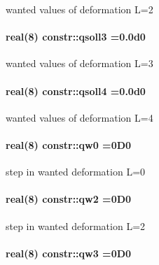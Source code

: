 wanted values of deformation L=2 

\paragraph[{\texorpdfstring{qsoll3}{qsoll3}}]{\setlength{\rightskip}{0pt plus 5cm}real(8) constr\+::qsoll3 =0.\+0d0}\hypertarget{namespaceconstr_a9efb1bbf605739cd45eb23ba02e096e4}{}\label{namespaceconstr_a9efb1bbf605739cd45eb23ba02e096e4}


wanted values of deformation L=3 

\paragraph[{\texorpdfstring{qsoll4}{qsoll4}}]{\setlength{\rightskip}{0pt plus 5cm}real(8) constr\+::qsoll4 =0.\+0d0}\hypertarget{namespaceconstr_a7bc9e25c46df09075468fed7a86255f7}{}\label{namespaceconstr_a7bc9e25c46df09075468fed7a86255f7}


wanted values of deformation L=4 

\paragraph[{\texorpdfstring{qw0}{qw0}}]{\setlength{\rightskip}{0pt plus 5cm}real(8) constr\+::qw0 =0\+D0}\hypertarget{namespaceconstr_a161ed801cc9ba0cce6a99c1f538b1f11}{}\label{namespaceconstr_a161ed801cc9ba0cce6a99c1f538b1f11}


step in wanted deformation L=0 

\paragraph[{\texorpdfstring{qw2}{qw2}}]{\setlength{\rightskip}{0pt plus 5cm}real(8) constr\+::qw2 =0\+D0}\hypertarget{namespaceconstr_ab35bdc97e1451a6829b2a06c5ffb60a1}{}\label{namespaceconstr_ab35bdc97e1451a6829b2a06c5ffb60a1}


step in wanted deformation L=2 

\paragraph[{\texorpdfstring{qw3}{qw3}}]{\setlength{\rightskip}{0pt plus 5cm}real(8) constr\+::qw3 =0\+D0}\hypertarget{namespaceconstr_a7e725c2dd7ba2a518ad31afe2a64da7d}{}\label{namespaceconstr_a7e725c2dd7ba2a518ad31afe2a64da7d}



